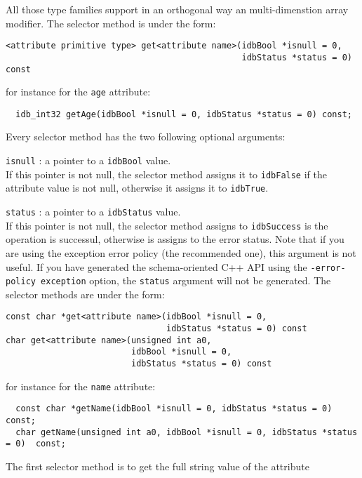 All those type families support in an orthogonal way an multi-dimenstion
array modifier.
The selector method is under the form:
\verbsize
\begin{verbatim}
<attribute primitive type> get<attribute name>(idbBool *isnull = 0,
                                               idbStatus *status = 0) const
\end{verbatim}
\normalsize
for instance for the \texttt{age} attribute:
\verbsize
\begin{verbatim}
  idb_int32 getAge(idbBool *isnull = 0, idbStatus *status = 0) const;
\end{verbatim}
\normalsize
Every selector method has the two following optional arguments:
\be
\item \texttt{isnull} : a pointer to a \texttt{idbBool} value.\\
If this pointer is not null, the selector method assigns it to \texttt{idbFalse}
if the attribute value is not null, otherwise it assigns it to \texttt{idbTrue}.
\item \texttt{status} : a pointer to a \texttt{idbStatus} value.\\
If this pointer is not null, the selector method assigns to \texttt{idbSuccess}
is the operation is successul, otherwise is assigns to the error status.
Note that if you are using the exception error policy (the recommended
one), this argument is not useful. If you have generated the schema-oriented
C++ API using the \texttt{-error-policy exception} option, the
\texttt{status} argument will not be generated.
\ee
{}
The selector methods are under the form:
\verbsize
\begin{verbatim}
const char *get<attribute name>(idbBool *isnull = 0,
                                idbStatus *status = 0) const
char get<attribute name>(unsigned int a0,
                         idbBool *isnull = 0,
                         idbStatus *status = 0) const
\end{verbatim}
\normalsize
for instance for the \texttt{name} attribute:
\verbsize
\begin{verbatim}
  const char *getName(idbBool *isnull = 0, idbStatus *status = 0) const;
  char getName(unsigned int a0, idbBool *isnull = 0, idbStatus *status = 0)  const;
\end{verbatim}
\normalsize
The first selector method is to get the full string value of the attribute
